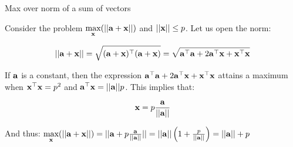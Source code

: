 \documentclass{beamer}
\begin{document}









\begin{frame}{Max over norm of a sum of vectors}
	\begin{flushleft}
		
		Consider the problem $\underset{\mathbf{x}}{\text{max}}(|| \mathbf{a} + \mathbf{x}||)$ and $|| \mathbf{x} || \leq p$. Let us open the norm:
		
		\begin{equation}
			|| \mathbf{a} + \mathbf{x} || = 
			\sqrt{(\mathbf{a} + \mathbf{x})^\top (\mathbf{a} + \mathbf{x})} = 
			\sqrt{\mathbf{a}^\top\mathbf{a} + 2\mathbf{a}^\top\mathbf{x} + \mathbf{x}^\top\mathbf{x}}
		\end{equation}
	
	If $\mathbf{a}$ is a constant, then the expression $\mathbf{a}^\top\mathbf{a} + 2\mathbf{a}^\top\mathbf{x} + \mathbf{x}^\top\mathbf{x}$ attains a maximum when $\mathbf{x}^\top\mathbf{x} = p^2$ and $\mathbf{a}^\top\mathbf{x} = ||\mathbf{a}||p$. This implies that:
	
	\begin{equation}
		\mathbf{x} = p\frac{\mathbf{a}}{|| \mathbf{a} ||}
	\end{equation}
	
	And thus: $\underset{\mathbf{x}}{\text{max}}(|| \mathbf{a} + \mathbf{x}||) = 
	|| \mathbf{a} + p\frac{\mathbf{a}}{|| \mathbf{a} ||}|| = 
	|| \mathbf{a} || \left( 1 + \frac{p}{|| \mathbf{a} ||} \right) = 
	|| \mathbf{a} || + p $	
		
	\end{flushleft}
\end{frame}
\end{document}
